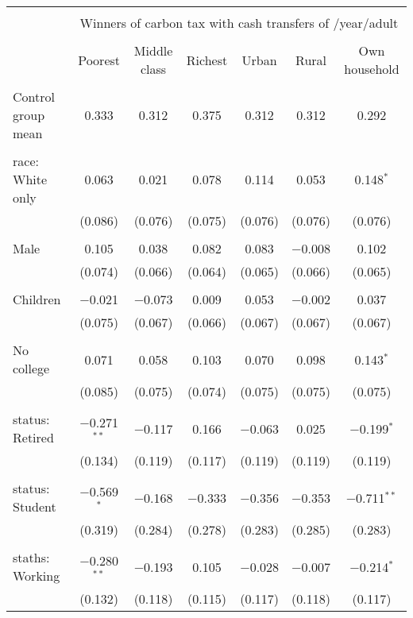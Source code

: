 
\begin{tabular}{@{\extracolsep{5pt}}lcccccc} 
\\[-1.8ex]\hline 
\hline \\[-1.8ex] 
 & \multicolumn{6}{c}{Winners of carbon tax with cash transfers of \textdollar 600/year/adult} \\ 
\cline{2-7} 
\\[-1.8ex] & Poorest & Middle class & Richest & Urban & Rural & Own household \\ 
\hline \\[-1.8ex] 
 Control group mean & 0.333 & 0.312 & 0.375 & 0.312 & 0.312 & 0.292  \\ \hline \\[-1.8ex] race: White only & 0.063 & 0.021 & 0.078 & 0.114 & 0.053 & 0.148$^{*}$ \\ 
  & (0.086) & (0.076) & (0.075) & (0.076) & (0.076) & (0.076) \\ 
  & & & & & & \\ 
 Male & 0.105 & 0.038 & 0.082 & 0.083 & $-$0.008 & 0.102 \\ 
  & (0.074) & (0.066) & (0.064) & (0.065) & (0.066) & (0.065) \\ 
  & & & & & & \\ 
 Children & $-$0.021 & $-$0.073 & 0.009 & 0.053 & $-$0.002 & 0.037 \\ 
  & (0.075) & (0.067) & (0.066) & (0.067) & (0.067) & (0.067) \\ 
  & & & & & & \\ 
 No college & 0.071 & 0.058 & 0.103 & 0.070 & 0.098 & 0.143$^{*}$ \\ 
  & (0.085) & (0.075) & (0.074) & (0.075) & (0.075) & (0.075) \\ 
  & & & & & & \\ 
 status: Retired & $-$0.271$^{**}$ & $-$0.117 & 0.166 & $-$0.063 & 0.025 & $-$0.199$^{*}$ \\ 
  & (0.134) & (0.119) & (0.117) & (0.119) & (0.119) & (0.119) \\ 
  & & & & & & \\ 
 status: Student & $-$0.569$^{*}$ & $-$0.168 & $-$0.333 & $-$0.356 & $-$0.353 & $-$0.711$^{**}$ \\ 
  & (0.319) & (0.284) & (0.278) & (0.283) & (0.285) & (0.283) \\ 
  & & & & & & \\ 
 staths: Working & $-$0.280$^{**}$ & $-$0.193 & 0.105 & $-$0.028 & $-$0.007 & $-$0.214$^{*}$ \\ 
  & (0.132) & (0.118) & (0.115) & (0.117) & (0.118) & (0.117) \\ 

\end{tabular}
